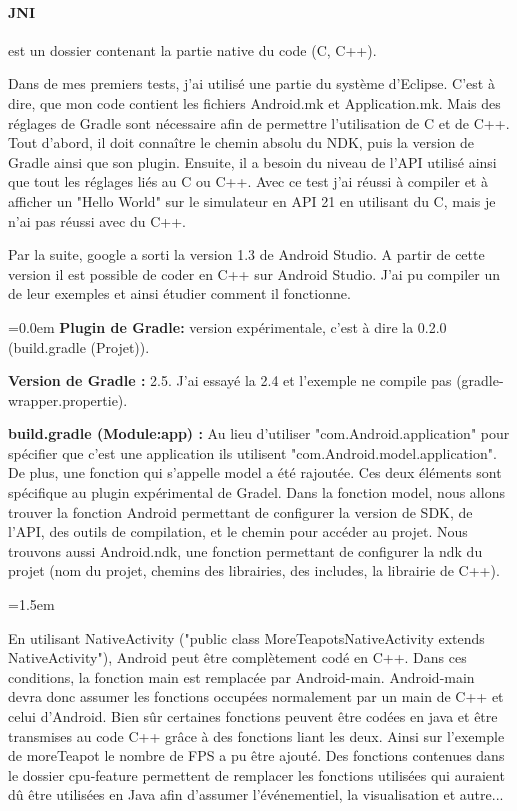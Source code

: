 \documentclass[a4paper,12pt]{article}
\begin{document}
\paragraph{JNI} est un dossier contenant la partie native du code (C, C++).
\vspace{0.25cm}

 	Dans de mes premiers tests, j'ai utilisé une partie du système d'Eclipse. C'est à dire, que mon code contient les fichiers Android.mk et Application.mk. Mais des réglages de Gradle sont nécessaire afin de permettre l'utilisation de C et de C++. Tout d'abord, il doit conna\^itre le chemin absolu du NDK, puis la version de Gradle ainsi que son plugin. Ensuite, il a besoin du niveau de l'API utilisé ainsi que tout les réglages liés au C ou C++. Avec ce test j'ai réussi à compiler et à afficher un "Hello World" sur le simulateur en API 21 en utilisant du C, mais je n'ai pas réussi avec du C++.
 	
 	Par la suite, google a sorti la version 1.3 de Android Studio. A partir de cette version il est possible de coder en C++ sur Android Studio. J'ai pu compiler un de leur exemples et ainsi étudier comment il fonctionne.

\parindent=0.0em
\textbf{Plugin de Gradle: } version expérimentale, c'est à dire la 0.2.0 (build.gradle (Projet)).

\textbf{Version de Gradle : } 2.5. J'ai essayé la 2.4 et l'exemple ne compile pas (gradle-wrapper.propertie).

\textbf{build.gradle (Module:app) : }  Au lieu d'utiliser "com.Android.application" pour spécifier que c'est une application ils utilisent "com.Android.model.application". De plus, une fonction qui s'appelle model a été rajoutée. Ces deux éléments sont spécifique au plugin expérimental de Gradel. Dans la fonction model, nous allons trouver la fonction Android permettant de configurer la version de SDK, de l'API, des outils de compilation, et le chemin pour accéder au projet. Nous trouvons aussi Android.ndk, une fonction permettant de configurer la ndk du projet (nom du projet, chemins des librairies, des includes, la librairie de C++).

\parindent=1.5em

En utilisant NativeActivity ("public class MoreTeapotsNativeActivity extends NativeActivity"), Android peut être complètement codé en C++. Dans ces conditions, la fonction main est remplacée par Android-main. Android-main devra donc assumer les fonctions occupées normalement par un main de C++ et celui d'Android.  Bien s\^ur certaines fonctions peuvent \^etre codées en java et \^etre transmises au code C++ gr\^ace à des fonctions liant les deux. Ainsi sur l'exemple de moreTeapot le nombre de FPS a pu \^etre ajouté. Des fonctions contenues dans le dossier cpu-feature permettent de remplacer les fonctions utilisées qui auraient d\^u \^etre utilisées en Java afin d'assumer l'événementiel, la visualisation et autre... 
\end{document}

